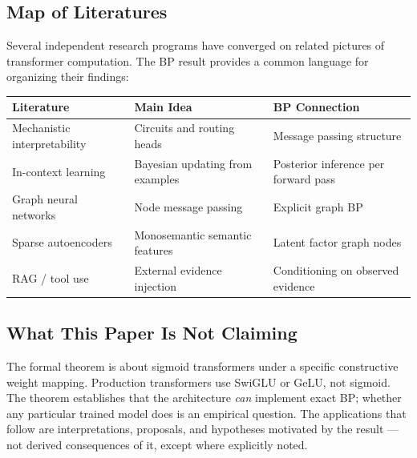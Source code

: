 \subsection*{Map of Literatures}

Several independent research programs have converged on related pictures of
transformer computation. The BP result provides a common language for
organizing their findings:

\begin{center}
\begin{tabular}{lll}
\toprule
Literature & Main Idea & BP Connection \\
\midrule
Mechanistic interpretability & Circuits and routing heads & Message passing structure \\
In-context learning & Bayesian updating from examples & Posterior inference per forward pass \\
Graph neural networks & Node message passing & Explicit graph BP \\
Sparse autoencoders & Monosemantic semantic features & Latent factor graph nodes \\
RAG / tool use & External evidence injection & Conditioning on observed evidence \\
\bottomrule
\end{tabular}
\end{center}

\subsection*{What This Paper Is Not Claiming}

The formal theorem is about sigmoid transformers under a specific
constructive weight mapping. Production transformers use SwiGLU or GeLU,
not sigmoid. The theorem establishes that the architecture \emph{can}
implement exact BP; whether any particular trained model does is an
empirical question. The applications that follow are interpretations,
proposals, and hypotheses motivated by the result --- not derived
consequences of it, except where explicitly noted.